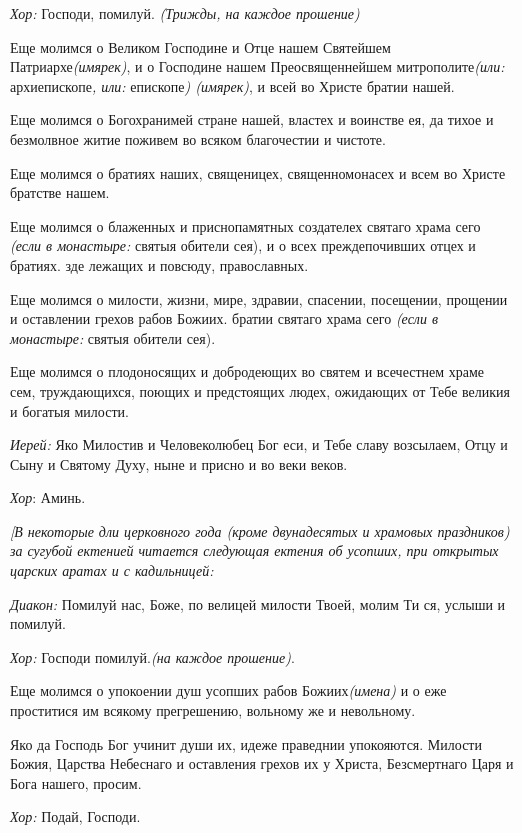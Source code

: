 {\itshape  Хор:} Господи, помилуй. {\itshape (Трижды, на каждое прошение)} 

 Еще молимся о Великом Господине и Отце нашем Святейшем Патриархе{\itshape  (имярек)}, и о Господине нашем Преосвященнейшем митрополите{\itshape  (или:} архиепископе{\itshape , или:} епископе{\itshape ) (имярек)}, и всей во Христе братии нашей. 

 Еще молимся о Богохранимей стране нашей, властех и воинстве ея, да тихое и безмолвное житие поживем во всяком благочестии и чистоте. 

 Еще молимся о братиях наших, священицех, священномонасех и всем во Христе братстве нашем.

 Еще молимся о блаженных и приснопамятных создателех святаго храма сего {\itshape (если в монастыре:} святыя обители сея), и о всех преждепочивших отцех и братиях. зде лежащих и повсюду, православных. 

 Еще молимся о милости, жизни, мире, здравии, спасении, посещении, прощении и оставлении грехов рабов Божиих. братии святаго храма сего {\itshape (если в монастыре:} святыя обители сея). 

 Еще молимся о плодоносящих и добродеющих во святем и всечестнем храме сем, труждающихся, поющих и предстоящих людех, ожидающих от Тебе великия и богатыя милости.

 {\itshape Иерей:} Яко Милостив и Человеколюбец Бог еси, и Тебе славу возсылаем, Отцу и Сыну и Святому Духу, ныне и присно и во веки веков.

 {\itshape Хор}: Аминь.

 {\itshape [В некоторые дли церковного года (кроме двунадесятых и храмовых праздников) за сугубой ектенией читается следующая ектения об усопших, при открытых царских аратах и с кадильницей:} 


 {\itshape Диакон:} Помилуй нас, Боже, по велицей милости Твоей, молим Ти ся, услыши и помилуй.

 {\itshape  Хор:} Господи помилуй.{\itshape  (на каждое прошение)}. 

 Еще молимся о упокоении душ усопших рабов Божиих{\itshape  (имена)} и о еже проститися им всякому прегрешению, вольному же и невольному.

 Яко да Господь Бог учинит души их, идеже праведнии упокояются. Милости Божия, Царства Небеснаго и оставления грехов их у Христа, Безсмертнаго Царя и Бога нашего, просим.

 {\itshape Хор:} Подай, Господи.

